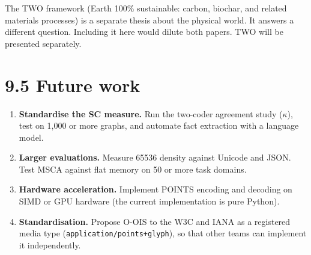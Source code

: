 The TWO framework (Earth 100\% sustainable: carbon, biochar, and related materials processes) is a separate thesis about the physical world. It answers a different question. Including it here would dilute both papers. TWO will be presented separately.

\section*{9.5 Future work}

\begin{enumerate}
\item \textbf{Standardise the SC measure.} Run the two-coder agreement study ($\kappa$), test on 1,000 or more graphs, and automate fact extraction with a language model.
\item \textbf{Larger evaluations.} Measure 65536 density against Unicode and JSON. Test MSCA against flat memory on 50 or more task domains.
\item \textbf{Hardware acceleration.} Implement POINTS encoding and decoding on SIMD or GPU hardware (the current implementation is pure Python).
\item \textbf{Standardisation.} Propose O-OIS to the W3C and IANA as a registered media type (\texttt{application/points+glyph}), so that other teams can implement it independently.
\end{enumerate}
